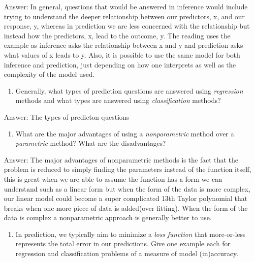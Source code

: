 \documentclass[
]{article}
\providecommand{\tightlist}{%
  \setlength{\itemsep}{0pt}\setlength{\parskip}{0pt}}
\begin{document}
Answer: In general, questions that would be answered in inference would
include trying to understand the deeper relationship between our
predictors, x, and our response, y, whereas in prediction we are less
concerned with the relationship but instead how the predictors, x, lead
to the outcome, y. The reading uses the example as inference asks the
relationship between x and y and prediction asks what values of x leads
to y. Also, it is possible to use the same model for both inference and
prediction, just depending on how one interprets as well as the
complexity of the model used.

\begin{enumerate}
\def\labelenumi{\arabic{enumi}.}
\setcounter{enumi}{3}
\tightlist
\item
  Generally, what types of prediction questions are answered using
  \emph{regression} methods and what types are answered using
  \emph{classification} methods?
\end{enumerate}

Answer: The types of predicton questions

\begin{enumerate}
\def\labelenumi{\arabic{enumi}.}
\setcounter{enumi}{4}
\tightlist
\item
  What are the major advantages of using a \emph{nonparametric} method
  over a \emph{parametric} method? What are the disadvantages?
\end{enumerate}

Answer: The major advantages of nonparametric methods is the fact that
the problem is reduced to simply finding the parameters instead of the
function itself, this is great when we are able to assume the function
has a form we can understand such as a linear form but when the form of
the data is more complex, our linear model could become a super
complicated 13th Taylor polynomial that breaks when one more piece of
data is added(over fitting). When the form of the data is complex a
nonparametric approach is generally better to use.

\begin{enumerate}
\def\labelenumi{\arabic{enumi}.}
\setcounter{enumi}{5}
\tightlist
\item
  In prediction, we typically aim to minimize a \emph{loss function}
  that more-or-less represents the total error in our predictions. Give
  one example each for regression and classification problems of a
  measure of model (in)accuracy.
\end{enumerate}
\end{document}
